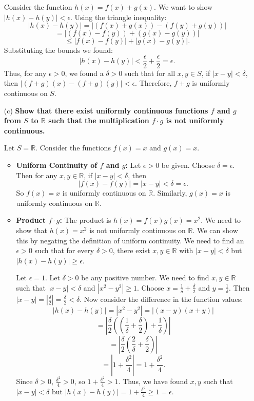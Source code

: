\documentclass{article}
\newcommand{\R}{\mathbb{R}}
\begin{document}
\begin{enumerate}
    Consider the function \(h(x) = f(x) + g(x)\). We want to show \(|h(x) - h(y)| < \epsilon\).
    Using the triangle inequality:
    \[ |h(x) - h(y)| = |(f(x) + g(x)) - (f(y) + g(y))| \]
    \[ = |(f(x) - f(y)) + (g(x) - g(y))| \]
    \[ \le |f(x) - f(y)| + |g(x) - g(y)|. \]
    Substituting the bounds we found:
    \[ |h(x) - h(y)| < \frac{\epsilon}{2} + \frac{\epsilon}{2} = \epsilon. \]
    Thus, for any \(\epsilon > 0\), we found a \(\delta > 0\) such that for all \(x, y \in S\), if \(|x-y| < \delta\), then \(|(f+g)(x) - (f+g)(y)| < \epsilon\).
    Therefore, \(f+g\) is uniformly continuous on \(S\).

  \item[(c)] \textbf{Show that there exist uniformly continuous functions \(f\) and \(g\) from \(S\) to \(\R\) such that the multiplication \(f \cdot g\) is not uniformly continuous.}

    Let \(S = \R\). Consider the functions \(f(x) = x\) and \(g(x) = x\).

    \begin{itemize}
        \item \textbf{Uniform Continuity of \(f\) and \(g\):}
            Let \(\epsilon > 0\) be given. Choose \(\delta = \epsilon\). Then for any \(x, y \in \R\), if \(|x-y| < \delta\), then
            \[ |f(x) - f(y)| = |x-y| < \delta = \epsilon. \]
            So \(f(x) = x\) is uniformly continuous on \(\R\). Similarly, \(g(x) = x\) is uniformly continuous on \(\R\).

        \item \textbf{Product \(f \cdot g\):}
            The product is \(h(x) = f(x)g(x) = x^2\). We need to show that \(h(x) = x^2\) is not uniformly continuous on \(\R\).
            We can show this by negating the definition of uniform continuity. We need to find an \(\epsilon > 0\) such that for every \(\delta > 0\), there exist \(x, y \in \R\) with \(|x-y| < \delta\) but \(|h(x) - h(y)| \ge \epsilon\).

            Let \(\epsilon = 1\). Let \(\delta > 0\) be any positive number. We need to find \(x, y \in \R\) such that \(|x-y| < \delta\) and \(|x^2 - y^2| \ge 1\).
            Choose \(x = \frac{1}{\delta} + \frac{\delta}{2}\) and \(y = \frac{1}{\delta}\).
            Then \(|x-y| = |\frac{\delta}{2}| = \frac{\delta}{2} < \delta\).
            Now consider the difference in the function values:
            \[ |h(x) - h(y)| = |x^2 - y^2| = |(x-y)(x+y)| \]
            \[ = \left| \frac{\delta}{2} \left( \left(\frac{1}{\delta} + \frac{\delta}{2}\right) + \frac{1}{\delta} \right) \right| \]
            \[ = \left| \frac{\delta}{2} \left( \frac{2}{\delta} + \frac{\delta}{2} \right) \right| \]
            \[ = \left| 1 + \frac{\delta^2}{4} \right| = 1 + \frac{\delta^2}{4}. \]
            Since \(\delta > 0\), \(\frac{\delta^2}{4} > 0\), so \(1 + \frac{\delta^2}{4} > 1\).
            Thus, we have found \(x, y\) such that \(|x-y| < \delta\) but \(|h(x) - h(y)| = 1 + \frac{\delta^2}{4} \ge 1 = \epsilon\).


\end{itemize}
\end{enumerate}
\end{document}
